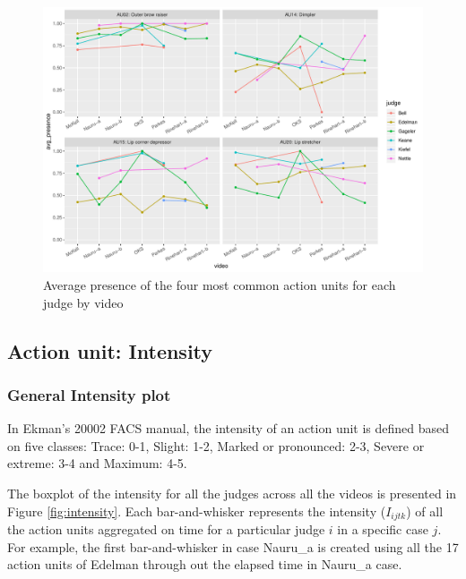 \documentclass{monashthesis}
\begin{document}
\begin{figure}

{\centering \includegraphics[width=1\linewidth]{figures/au-video-1} 

}

\caption{Average presence of the four most common action units for each judge by video\label{fig:common_video}}\label{fig:au-video}
\end{figure}

\hypertarget{action-unit-intensity}{%
\subsection{Action unit: Intensity}\label{action-unit-intensity}}

\hypertarget{general-intensity-plot}{%
\subsubsection{General Intensity plot}\label{general-intensity-plot}}

In Ekman's 20002 FACS manual, the intensity of an action unit is defined based on five classes: Trace: 0-1, Slight: 1-2, Marked or pronounced: 2-3, Severe or extreme: 3-4 and Maximum: 4-5.

The boxplot of the intensity for all the judges across all the videos is presented in Figure \ref{fig:intensity}. Each bar-and-whisker represents the intensity (\(I_{ijtk}\)) of all the action units aggregated on time for a particular judge \(i\) in a specific case \(j\). For example, the first bar-and-whisker in case Nauru\_a is created using all the 17 action units of Edelman through out the elapsed time in Nauru\_a case.
\end{document}
